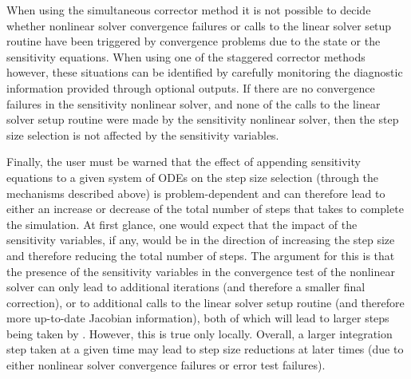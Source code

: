When using the simultaneous corrector method it is not possible to decide whether 
nonlinear solver convergence failures or calls to the linear solver setup routine
have been triggered by convergence problems due to the state or the sensitivity 
equations.
When using one of the staggered corrector methods however, these situations can be 
identified by carefully monitoring the diagnostic information provided through 
optional outputs. If there are no convergence
failures in the sensitivity nonlinear solver, and none
of the calls to the linear solver setup routine were made by the sensitivity
nonlinear solver, then the step size selection is
not affected by the sensitivity variables.

Finally, the user must be warned that the effect of appending sensitivity 
equations to a given system of ODEs on the step size selection 
(through the mechanisms described above) is problem-dependent and can therefore
lead to either an increase or decrease of the total number of steps that {\cvodes} takes
to complete the simulation. At first glance, one would expect that the impact
of the sensitivity variables, if any, would be in the direction of increasing the
step size and therefore reducing the total number of steps. The argument for this
is that the presence of the sensitivity variables in the convergence test of the
nonlinear solver can only lead to additional iterations (and therefore a smaller
final correction), or to additional calls to the linear solver setup routine
(and therefore more up-to-date Jacobian information), both of which will lead
to larger steps being taken by {\cvodes}. However, this is true only locally.
Overall, a larger integration step taken at a given time may lead to 
step size reductions at later times (due to either nonlinear solver convergence
failures or error test failures).